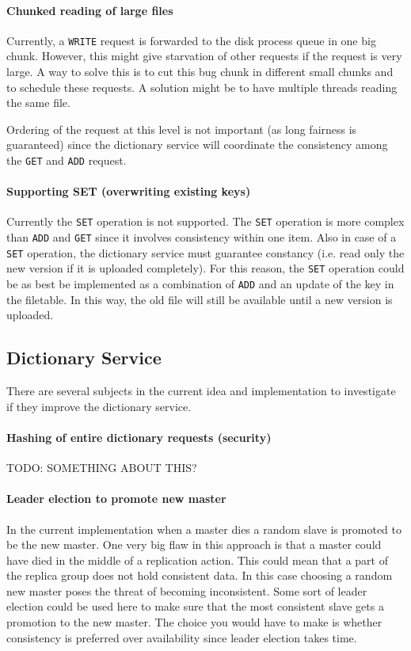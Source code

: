\documentclass[12pt,a4paper]{scrartcl}
\begin{document}
\paragraph{Chunked reading of large files}
Currently, a \verb|WRITE| request is forwarded to the disk process queue in one big chunk. However, this might give starvation of other requests if the request is very large. A way to solve this is to cut this bug chunk in different small chunks and to schedule these requests. A solution might be to have multiple threads reading the same file. 

Ordering of the request at this level is not important (as long fairness is guaranteed) since the dictionary service will coordinate the consistency among the \verb|GET| and \verb|ADD| request.

\paragraph{Supporting SET (overwriting existing keys)}
Currently the \verb|SET| operation is not supported. The \verb|SET| operation is more complex than \verb|ADD| and \verb|GET| since it involves consistency within one item. Also in case of a \verb|SET| operation, the dictionary service must guarantee constancy (i.e. read only the new version if it is uploaded completely). For this reason, the \verb|SET| operation could be as best be implemented as a combination of \verb|ADD| and an update of the key in the filetable. In this way, the old file will still be available until a new version is uploaded.

\subsection{Dictionary Service}
There are several subjects in the current idea and implementation to investigate if they improve the dictionary service.

\paragraph{Hashing of entire dictionary requests (security)}
TODO: SOMETHING ABOUT THIS?

\paragraph{Leader election to promote new master}
In the current implementation when a master dies a random slave is promoted to be the new master. One very big flaw in this approach is that a master could have died in the middle of a replication action. This could mean that a part of the replica group does not hold consistent data. In this case choosing a random new master poses the threat of becoming inconsistent. Some sort of leader election could be used here to make sure that the most consistent slave gets a promotion to the new master. The choice you would have to make is whether consistency is preferred over availability since leader election takes time.
\end{document}
